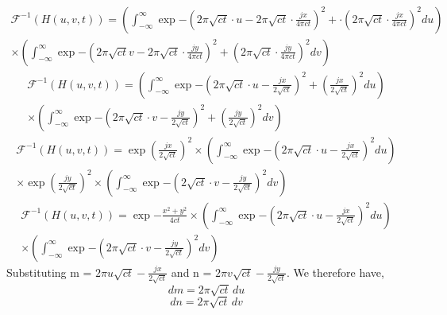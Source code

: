 \documentclass{article}
\begin{document}
\begin{enumerate}
\begin{multline*}
\end{multline*}
\begin{multline*}
    \mathcal{F}^{-1}(H(u, v, t)) = \left( \int_{-\infty}^{\infty} 
    \exp { -\left(2\pi\sqrt{ct} \cdot u - 2\pi\sqrt{ct} \cdot \frac{jx}{4\pi c t}\right)^2 
    + \cdot \left( 2\pi\sqrt{ct} \cdot \frac{jx}{4\pi ct} \right)^2 } du \right) \\
    \times \left( \int_{-\infty}^{\infty} 
    \exp { -\left(2\pi\sqrt{ct}v - 2\pi\sqrt{ct}\cdot\frac{jy}{4\pi c t}\right)^2 
    + \left( 2\pi\sqrt{ct}\cdot\frac{jy}{4\pi ct} \right)^2 } dv \right)
\end{multline*}
\begin{multline*}
    \mathcal{F}^{-1}(H(u, v, t)) = \left( \int_{-\infty}^{\infty} 
    \exp { -\left(2\pi\sqrt{ct} \cdot u - \frac{jx}{2\sqrt{ct}}\right)^2 
    + \left( \frac{jx}{2\sqrt{ct}} \right)^2 } du \right) \\
    \times \left( \int_{-\infty}^{\infty} 
    \exp { -\left(2\pi\sqrt{ct}\cdot v - \frac{jy}{2\sqrt{ct}}\right)^2 
    + \left( \frac{jy}{2\sqrt{ct}} \right)^2 } dv \right)
\end{multline*}
\begin{multline*}
    \mathcal{F}^{-1}(H(u, v, t)) = \exp{\left( \frac{jx}{2\sqrt{ct}} \right)^2} \times \left( \int_{-\infty}^{\infty} 
    \exp { -\left(2\pi\sqrt{ct} \cdot u - \frac{jx}{2\sqrt{ct}}\right)^2} du \right) \\
    \times \exp {\left( \frac{jy}{2\sqrt{ct}} \right)^2} \times \left( \int_{-\infty}^{\infty} 
    \exp { -\left(2\sqrt{ct} \cdot v - \frac{jy}{2\sqrt{ct}}\right)^2} dv \right)
\end{multline*}
\begin{multline*}
    \mathcal{F}^{-1}(H(u, v, t)) = \exp{-\frac{x^2 + y^2}{4ct}} \times \left( \int_{-\infty}^{\infty} 
    \exp { -\left(2\pi\sqrt{ct} \cdot u - \frac{jx}{2\sqrt{ct}}\right)^2} du \right) \\
    \times \left( \int_{-\infty}^{\infty} 
    \exp { -\left(2\pi\sqrt{ct} \cdot v - \frac{jy}{2\sqrt{ct}}\right)^2} dv \right)
\end{multline*}
Substituting m = $2\pi u\sqrt{ct} - \frac{jx}{2\sqrt{ct}}$ and n = $2\pi v\sqrt{ct} - \frac{jy}{2\sqrt{ct}}$. We therefore have,
\[
    dm = 2 \pi \sqrt{ct} \, du
\]
\[
    dn = 2 \pi \sqrt{ct} \, dv
\]


\end{enumerate}
\end{document}
